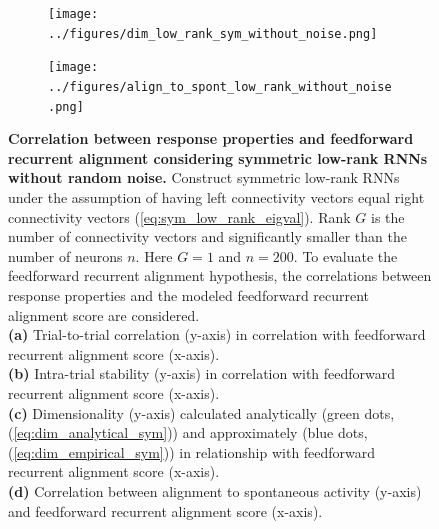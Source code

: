 \documentclass[11pt]{article}
\begin{document}
\begin{figure}[H]
			\newline
			\begin{subfigure}[b]{0.45\textwidth}
				\texttt{[image: ../figures/dim\_low\_rank\_sym\_without\_noise.png]}
				\caption{}
			\end{subfigure}
			\begin{subfigure}[b]{0.45\textwidth}
				\texttt{[image: ../figures/align\_to\_spont\_low\_rank\_without\_noise.png]}
				\caption{}
			\end{subfigure}
			\caption{\textbf{Correlation between response properties and feedforward recurrent alignment considering symmetric low-rank RNNs without random noise.} Construct symmetric low-rank RNNs under the assumption of having left connectivity vectors equal right connectivity vectors (\ref{eq:sym_low_rank_eigval}). Rank $G$ is the number of connectivity vectors and significantly smaller than the number of neurons $n$. Here $G = 1$ and $n = 200$. To evaluate the feedforward recurrent alignment hypothesis, the correlations between response properties and the modeled feedforward recurrent alignment score are considered. \\
			\textbf{(a)} Trial-to-trial correlation (y-axis) in correlation with feedforward recurrent alignment score (x-axis).\\
			\textbf{(b)} Intra-trial stability (y-axis) in correlation with feedforward recurrent alignment score (x-axis).\\
			\textbf{(c)} Dimensionality (y-axis) calculated analytically (green dots, (\ref{eq:dim_analytical_sym})) and approximately (blue dots, (\ref{eq:dim_empirical_sym})) in relationship with feedforward recurrent alignment score (x-axis).\\
			\textbf{(d)} Correlation between alignment to spontaneous activity (y-axis) and feedforward recurrent alignment score (x-axis).}
		
			\label{fig:ttc_its_low_rank_sym_no_noise}
		\end{figure}
	
\end{document}
